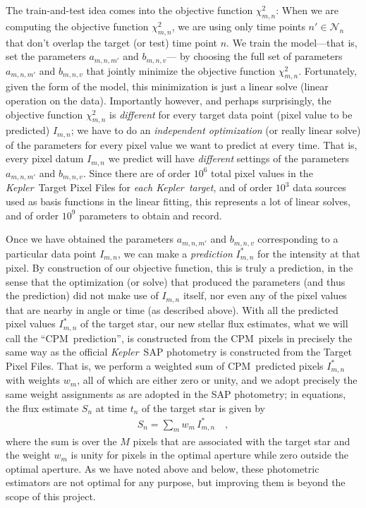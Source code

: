 \documentclass[12pt, preprint]{aastex}
\newcommand{\project}[1]{\textsl{#1}}
\newcommand{\Kepler}{\project{Kepler}}
\newcommand{\name}{CPM}
\newcommand{\set}[1]{\mathcal{#1}}
\begin{document}
The train-and-test idea comes into the objective function $\chi^2_{m,n}$:
When we are computing the objective function $\chi^2_{m,n}$,
  we are using only time points $n'\in\set{N}_n$ that don't overlap the target (or test) time point $n$.
We train the model---that is, set the parameters $a_{m,n,m'}$ and $b_{m,n,v}$---%
  by choosing the full set of parameters $a_{m,n,m'}$ and $b_{m,n,v}$ 
  that jointly minimize the objective function $\chi^2_{m,n}$.
Fortunately, given the form of the model,
  this minimization is just a linear solve (linear operation on the data).
Importantly however, and perhaps surprisingly, the objective function $\chi^2_{m,n}$ is \emph{different}
  for every target data point (pixel value to be predicted) $I_{m,n}$;
  we have to do an \emph{independent optimization} (or really linear solve)
  of the parameters for every pixel value we want to predict at every time.
That is, every pixel datum $I_{m,n}$ we predict will have
  \emph{different} settings of the parameters $a_{m,n,m'}$ and $b_{m,n,v}$.
Since there are of order $10^{6}$ total pixel values in the \Kepler\ Target Pixel Files for \emph{each \Kepler\ target},
  and of order $10^{3}$ data sources used as basis functions in the linear fitting,
  this represents a lot of linear solves, and of order $10^{9}$ parameters to obtain and record.

Once we have obtained the parameters $a_{m,n,m'}$ and $b_{m,n,v}$ corresponding to a particular data point $I_{m,n}$,
  we can make a \emph{prediction} $I^{\ast}_{m,n}$ for the intensity at that pixel.
By construction of our objective function, this is truly a prediction,
  in the sense that the optimization (or solve) that produced the parameters
  (and thus the prediction)
  did not make use of $I_{m,n}$ itself,
  nor even any of the pixel values that are nearby in angle or time
  (as described above).
  With all the predicted pixel values $I^{\ast}_{m,n}$ of the target star,  
  our new stellar flux estimates,
  what we will call the ``\name\ prediction'',
  is constructed from the \name\ pixels
  in precisely the same way as the official \Kepler\ SAP photometry
  is constructed from the Target Pixel Files.
That is, we perform a weighted sum of \name\ predicted pixels $I^{\ast}_{m,n}$ with weights $w_m$,
  all of which are either zero or unity,
  and we adopt precisely the same weight assignments as are adopted in the SAP photometry;
  in equations, the flux estimate $S_n$ at time $t_n$ of the target star is given by
\begin{eqnarray}
S_n = \sum_m w_m\,I^{\ast}_{m,n}
\quad ,
\end{eqnarray}
where the sum is over the $M$ pixels that are associated with the target star and the weight $w_m$ is unity for pixels in the optimal
aperture while zero outside the optimal aperture.
As we have noted above and below, these photometric estimators are not optimal for any purpose,
  but improving them is beyond the scope of this project.
\end{document}
